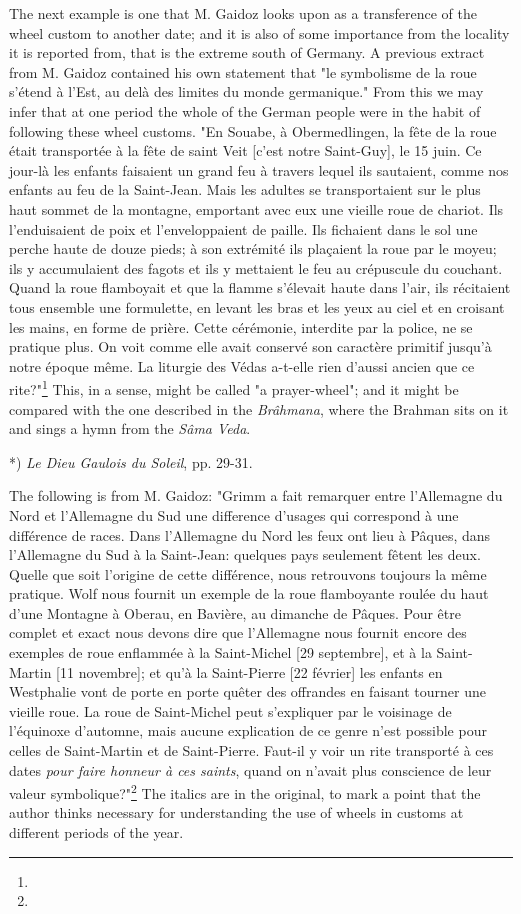 \documentclass[a4paper, 11pt, oneside, polutonikogreek, english]{article}
\begin{document}
The next example is one that M. Gaidoz looks upon as a transference of the wheel custom to another date; and it is also of some importance from the locality it is reported from, that is the extreme south of Germany. A previous extract from M. Gaidoz contained his own statement that "le symbolisme de la roue s'étend à l'Est, au delà des limites du monde germanique." From this we may infer that at one period the whole of the German people were in the habit of following these wheel customs. "En Souabe, à Obermedlingen, la fête de la roue était transportée à la fête de saint Veit [c'est notre Saint-Guy], le 15 juin. Ce jour-là les enfants faisaient un grand feu à travers lequel ils sautaient, comme nos enfants au feu de la Saint-Jean. Mais les adultes se transportaient sur le plus haut sommet de la montagne, emportant avec eux une vieille roue de chariot. Ils l'enduisaient de poix et l'enveloppaient de paille. Ils fichaient dans le sol une perche haute de douze pieds; à son extrémité ils plaçaient la roue par le moyeu; ils y accumulaient des fagots et ils y mettaient le feu au crépuscule du couchant. Quand la roue flamboyait et que la flamme s'élevait haute dans l'air, ils récitaient tous ensemble une formulette, en levant les bras et les yeux au ciel et en croisant les mains, en forme de prière. Cette cérémonie, interdite par la police, ne se pratique plus. On voit comme elle avait conservé son caractère primitif jusqu'à notre époque même. La liturgie des Védas a-t-elle rien d'aussi ancien que ce rite?"\footnote{} This, in a sense, might be called "a prayer-wheel"; and it might be compared with the one described in the \emph{Brâhmana}, where the Brahman sits on it and sings a hymn from the \emph{Sâma Veda}.

*) \emph{Le Dieu Gaulois du Soleil}, pp.  29-31.

The following is from M. Gaidoz: "Grimm a fait remarquer entre l'Allemagne du Nord et l'Allemagne du Sud une difference d'usages qui correspond à une différence de races. Dans l'Allemagne du Nord les feux ont lieu à Pâques, dans l'Allemagne du Sud à la Saint-Jean: quelques pays seulement fêtent les deux. Quelle que soit l'origine de cette différence, nous retrouvons toujours la même pratique. Wolf nous fournit un exemple de la roue flamboyante roulée du haut d'une Montagne à Oberau, en Bavière, au dimanche de Pâques. Pour être complet et exact nous devons dire que l'Allemagne nous fournit encore des exemples de roue enflammée à la Saint-Michel [29 septembre], et à la Saint-Martin [11 novembre]; et qu'à la Saint-Pierre [22 février] les enfants en Westphalie vont de porte en porte quêter des offrandes en faisant tourner une vieille roue. La roue de Saint-Michel peut s'expliquer par le voisinage de l'équinoxe d'automne, mais aucune explication de ce genre n'est possible pour celles de Saint-Martin et de Saint-Pierre. Faut-il y voir un rite transporté à ces dates \emph{pour faire honneur à ces saints}, quand on n'avait plus conscience de leur valeur symbolique?"\footnote{} The italics are in the original, to mark a point that the author thinks necessary for understanding the use of wheels in customs at different periods of the year.
\end{document}
